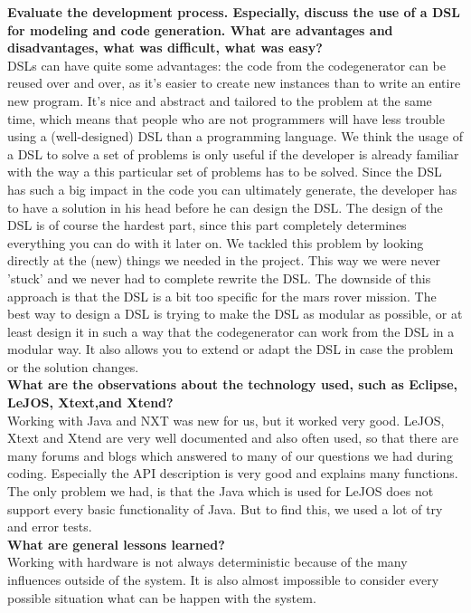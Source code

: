 \documentclass[11pt,a4paper]{article}
\begin{document}
\textbf{Evaluate the development process. Especially, discuss the use of a DSL for modeling and code generation. What are advantages and disadvantages, what was difficult, what was easy?}\\
DSLs can have quite some advantages: the code from the codegenerator can be reused over and over, as it's easier to create new instances than to write an entire new program. It's nice and abstract and tailored to the problem at the same time, which means that people who are not programmers will have less trouble using a (well-designed) DSL than a programming language. 
We think the usage of a DSL to solve a set of problems is only useful if the developer is already familiar with the way a this particular set of problems has to be solved. Since the DSL has such a big impact in the code you can ultimately generate, the developer has to have a solution in his head before he can design the DSL. 
The design of the DSL is of course the hardest part, since this part completely determines everything you can do with it later on. We tackled this problem by looking directly at the (new) things we needed in the project. This way we were never 'stuck' and we never had to complete rewrite the DSL. The downside of this approach is that the DSL is a bit too specific for the mars rover mission.
The best way to design a DSL is trying to make the DSL as modular as possible, or at least design it in such a way that the codegenerator can work from the DSL in a modular way. It also allows you to extend or adapt the DSL in case the problem or the solution changes.\\

\textbf{What are the observations about the technology used, such as Eclipse, LeJOS, Xtext,and Xtend?}\\
Working with Java and NXT was new for us, but it worked very good. LeJOS, Xtext and Xtend are very well documented and also often used, so that there are many forums and blogs which answered to many of our questions we had during coding. Especially the API description is very good and explains many functions.\\
The only problem we had, is that the Java which is used for LeJOS does not support every basic functionality of Java. But to find this, we used a lot of try and error tests. \\

\textbf{What are general lessons learned?}\\
Working with hardware is not always deterministic because of the many influences outside of the system. It is also almost impossible to consider every possible situation what can be happen with the system. 
\end{document}

